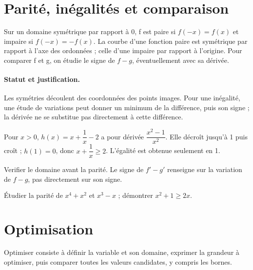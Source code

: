 \section{Parité, inégalités et comparaison}\label{C06-U4}
\begin{keypoint}
Sur un domaine symétrique par rapport à 0, f est paire si $f(-x)=f(x)$ et impaire si $f(-x)=-f(x)$. La courbe d’une fonction paire est symétrique par rapport à l’axe des ordonnées ; celle d’une impaire par rapport à l’origine. Pour comparer f et g, on étudie le signe de $f-g$, éventuellement avec sa dérivée.
\end{keypoint}
\paragraph{Statut et justification.} Les symétries découlent des coordonnées des points images. Pour une inégalité, une étude de variations peut donner un minimum de la différence, puis son signe ; la dérivée ne se substitue pas directement à cette différence.
\begin{example}Pour $x>0$, $h(x)=x+\dfrac{1}{x}-2$ a pour dérivée $\dfrac{x^2-1}{x^2}$. Elle décroît jusqu’à 1 puis croît ; $h(1)=0$, donc $x+\dfrac{1}{x}\geq 2$. L’égalité est obtenue seulement en 1.\end{example}\label{C06-EX4}
\begin{pitfall}Verifier le domaine avant la parité. Le signe de $f\prime-g\prime$ renseigne sur la variation de $f-g$, pas directement sur son signe.\end{pitfall}
\begin{application}Étudier la parité de $x^4+x^2$ et $x^3-x$ ; démontrer $x^2+1\geq2x$.\end{application}\label{C06-AP4}
\section{Optimisation}\label{C06-U5}
\begin{keypoint}
Optimiser consiste à définir la variable et son domaine, exprimer la grandeur à optimiser, puis comparer toutes les valeurs candidates, y compris les bornes.
\end{keypoint}
